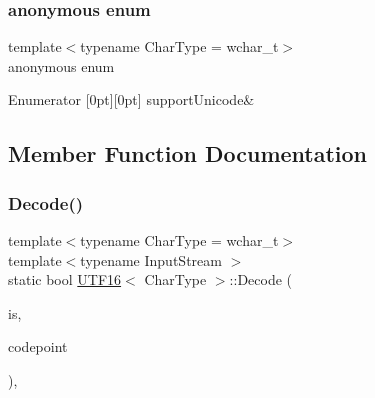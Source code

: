 \subsubsection{\texorpdfstring{anonymous enum}{anonymous enum}}
{\footnotesize\ttfamily template$<$typename Char\+Type  = wchar\+\_\+t$>$ \\
anonymous enum}

\begin{DoxyEnumFields}{Enumerator}
[0pt][0pt]{}\mbox{\label{structUTF16_a34817dbbc470e278ad65aff8db6ebdcfa98b69a56ef3548af9741fff3fcb7b28c}} 
support\+Unicode&\\
\hline

\end{DoxyEnumFields}


\subsection{Member Function Documentation}
\mbox{\label{structUTF16_a124c79dfd9f9b4c3fb65bd55ba17b4be}} 
\subsubsection{\texorpdfstring{Decode()}{Decode()}}
{\footnotesize\ttfamily template$<$typename Char\+Type  = wchar\+\_\+t$>$ \\
template$<$typename Input\+Stream $>$ \\
static bool \hyperlink{structUTF16}{U\+T\+F16}$<$ Char\+Type $>$\+::Decode (\begin{DoxyParamCaption}\item[{Input\+Stream \&}]{is,  }\item[{unsigned $\ast$}]{codepoint }\end{DoxyParamCaption})\hspace{0.3cm}{\ttfamily [inline]}, {\ttfamily [static]}}

\mbox{\label{structUTF16_a9d8ded01244e30d037c4afa10ee2b30e}} 
